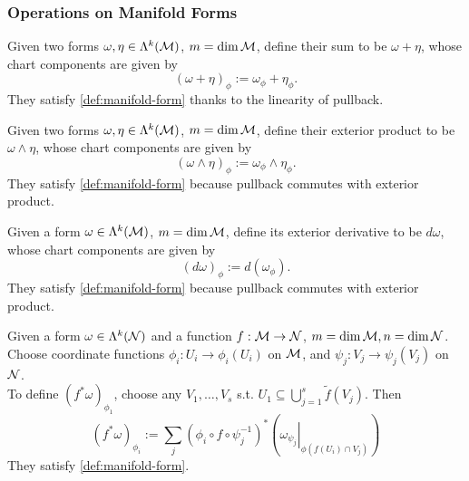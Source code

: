 \documentclass[../main.tex]{subfiles}
\begin{document}
    \subsubsection{Operations on Manifold Forms}
    \begin{definition}[Addition]\label{def:mani-form-add}
        Given two forms \(\omega, \eta \in \form{k}{M}\), 
        \(m=\dim \manifold[M]\), define their sum to be \(\omega+\eta\), whose 
        chart components are given by 
        \[
        (\omega+\eta)_\phi := \omega_\phi + \eta_\phi.
        \]
        They satisfy \cref{def:manifold-form} thanks to the linearity of pullback.
    \end{definition}
    \begin{definition}\label{def:mani-form-exterior-product}
        Given two forms \(\omega, \eta \in \form{k}{M}\), 
        \(m=\dim \manifold[M]\), define their exterior product to be 
        \(\omega\wedge\eta\), whose chart components are given by 
        \[
        (\omega\wedge\eta)_\phi := \omega_\phi\wedge \eta_\phi.
        \]
        They satisfy \cref{def:manifold-form} because pullback commutes with 
        exterior product.
    \end{definition}
    \begin{definition}\label{def:mani-form-diff}
        Given a form \(\omega \in \form{k}{M}\), 
        \(m=\dim \manifold[M]\), define its exterior derivative to be
        \(d\omega\), whose chart components are given by 
        \[
        (d\omega)_\phi := d(\omega_\phi).
        \]
        They satisfy \cref{def:manifold-form} because pullback commutes with 
        exterior product.
    \end{definition}
    \begin{definition}[Pullback]\label{def:mani-form-pullback}
        Given a form \(\omega \in \form{k}{N}\) and a function 
        \(f : \manifold[M] \to \manifold[N]\), \(m=\dim \manifold[M], 
        n=\dim \manifold[N]\). Choose coordinate functions 
        \(\phi_i : U_i \to \phi_i(U_i)\) on \(\manifold[M]\), and 
        \(\psi_j : V_j \to \psi_j(V_j)\) on \(\manifold[N]\). \\
        To define \((f^*\omega)_{\phi_1}\), choose any 
        \(V_1, \dots, V_s\) s.t. \(U_1 \subseteq \bigcup_{j=1}^{s} \tilde{f}(V_j)\).
        Then 
        \[
        (f^*\omega)_{\phi_i} := \sum_{j}^{} 
        (\phi_i\circ f\circ \psi_j ^{-1})^*
        \left(\left.\omega_{\psi_j}\right|_{\phi(f(U_i) \cap V_j)}\right)
        \]
        They satisfy \cref{def:manifold-form}.
    \end{definition}
\end{document}
